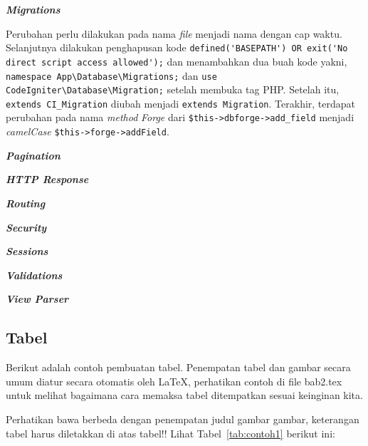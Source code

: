 \textbf{\textit{Migrations}}

Perubahan perlu dilakukan pada nama \textit{file} menjadi nama dengan cap waktu. Selanjutnya dilakukan penghapusan kode \verb|defined('BASEPATH') OR exit('No direct script access allowed');| dan menambahkan dua buah kode yakni, \verb|namespace App\Database\Migrations;| dan \verb|use CodeIgniter\Database\Migration;| setelah membuka tag PHP. Setelah itu, \verb|extends CI_Migration| diubah menjadi \verb|extends Migration|. Terakhir, terdapat perubahan pada nama \textit{method} \textit{Forge} dari \verb|$this->dbforge->add_field| menjadi \textit{camelCase} \verb|$this->forge->addField|.
 
\textbf{\textit{Pagination}}



\textbf{\textit{HTTP Response}}



\textbf{\textit{Routing}}



\textbf{\textit{Security}}



\textbf{\textit{Sessions}}



\textbf{\textit{Validations}}



\textbf{\textit{View Parser}}


\subsection{Tabel}  
Berikut adalah contoh pembuatan tabel. 
Penempatan tabel dan gambar secara umum diatur secara otomatis oleh \LaTeX{}, perhatikan contoh di file bab2.tex untuk melihat bagaimana cara memaksa tabel ditempatkan sesuai keinginan kita.

Perhatikan bawa berbeda dengan penempatan judul gambar gambar, keterangan tabel harus diletakkan di atas tabel!!
Lihat Tabel~\ref{tab:contoh1} berikut ini:

